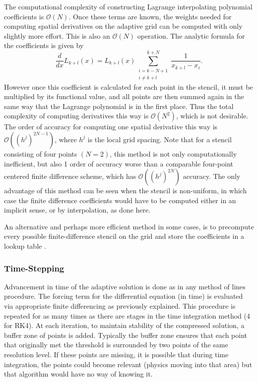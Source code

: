 \documentclass[10.5pt]{article}
\begin{document}
The computational complexity of constructing Lagrange interpolating polynomial coefficients is $\mathcal{O}(N)$. 
Once these terms are known, the weights needed for computing spatial derivatives on the adaptive grid can be computed 
with only slightly more effort.
This is also an $\mathcal{O}(N)$ operation. The analytic formula for the coefficients is given by
\begin{equation}
    \frac{d}{dx} L_{k+l}(x) = L_{k+l}(x) \sum_{ \substack{ i=k-N+1 \\ i\neq k+l } }^{k+N} \frac{1}{x_{k+l}-x_i}.
\end{equation}
However once this coefficient is calculated for each point in the stencil, it must be multiplied by its functional value, 
and all points are then summed again in the same way that the Lagrange polynomial is in the first place. 
Thus the total complexity of computing derivatives this way is $\mathcal{O}(N^2)$, which is not desirable. The order of 
accuracy for computing one spatial derivative this way is $\mathcal{O}((h^j)^{2N-1})$, where $h^j$ is the local grid spacing. 
Note that for a stencil consisting of four points $(N=2)$, this method is not only computationally inefficient, but also 1 order 
of accuracy worse than a comparable four-point centered finite difference scheme, which has $\mathcal{O}((h^j)^{2N})$
accuracy. The only advantage of this method can be seen when the stencil is non-uniform, in which case the finite difference 
coefficients would have to be computed either in an implicit sense, or by interpolation, as done here.

An alternative and perhaps more efficient method in some cases, is to precompute every possible finite-difference stencil on the grid
and store the coefficients in a lookup table \cite{rastigejev}.

\subsubsection*{Time-Stepping}
Advancement in time of the adaptive solution is done as in any method of lines procedure. The forcing term for the differential equation
(in time) is evaluated via appropriate finite differencing as previously explained. This procedure is repeated for as many times as there
are stages in the time integration method (4 for RK4). At each iteration, to maintain stability of the compressed solution,
a buffer zone of points is added. Typically the buffer zone ensures that each point that originally met the threshold is surrounded
by two points of the same resolution level. If these points are missing, it is possible that during time integration, the points
could become relevant (physics moving into that area) but that algorithm would have no way of knowing it.
\end{document}

